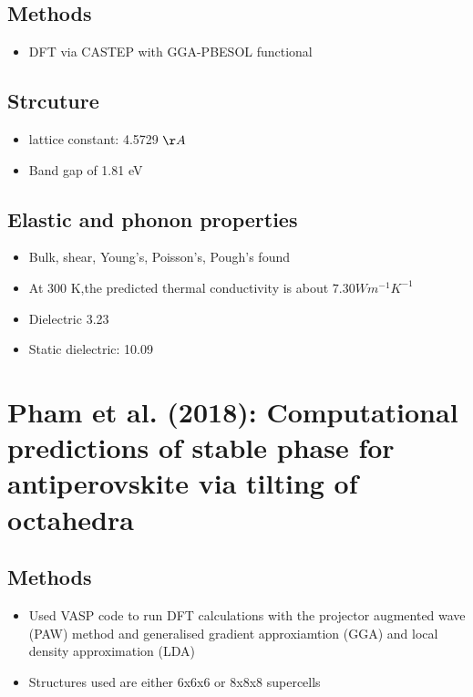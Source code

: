 \documentclass[10pt,a4paper, titlepage]{article}
\begin{document}
\subsection{Methods}

\begin{itemize}
  \item DFT via CASTEP with GGA-PBESOL functional
\end{itemize}

\subsection{Strcuture}

\begin{itemize}
  \item {} lattice constant: 4.5729 $\AA$
  \item Band gap of 1.81 eV
\end{itemize}

\subsection{Elastic and phonon properties}

\begin{itemize}
  \item Bulk, shear, Young's, Poisson's, Pough's found 
  \item At 300 K,the predicted thermal conductivity is about $7.30 W m^{-1}K^{-1}$
  \item Dielectric 3.23
  \item Static dielectric: 10.09
\end{itemize}

\section{Pham et al. (2018): Computational predictions of stable phase for antiperovskite  via tilting of  octahedra}

\subsection{Methods}

\begin{itemize}
  \item Used VASP code to run DFT calculations with the projector augmented wave (PAW) method and generalised gradient approxiamtion (GGA) and local density approximation (LDA)
  \item Structures used are either 6x6x6 or 8x8x8 supercells
\end{itemize}
\end{document}
